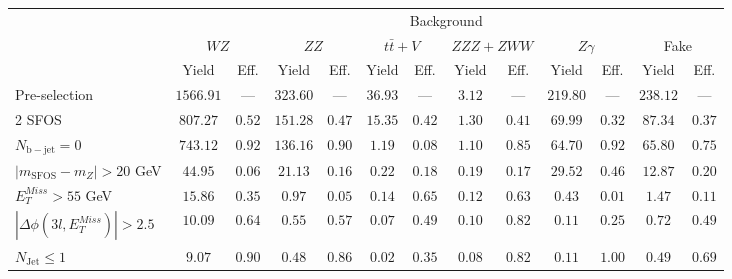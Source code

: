 \begin{tabular}{l||c|c||c|c||c|c||c|c||c|c||c|c}
\hline
 &       \multicolumn{12}{c||}{Background} \\
 & \multicolumn{2}{c||}{$WZ$} & \multicolumn{2}{c||}{$ZZ$} & \multicolumn{2}{c||}{$t\bar{t}+V$} & \multicolumn{2}{c||}{$ZZZ+ZWW$} & \multicolumn{2}{c||}{$Z\gamma$} & \multicolumn{2}{c}{Fake} \\ 
 & Yield & Eff. & Yield & Eff. & Yield & Eff. & Yield & Eff. & Yield & Eff. & Yield & Eff. \\
\hline\hline
Pre-selection &  $1566.91$ & --- &  $323.60$ & --- &  $36.93$ & --- &  $3.12$ & --- &  $219.80$ & --- &  $238.12$ & ---  \\ 
\hline
2 SFOS &  $807.27$ &  $0.52$ &  $151.28$ &  $0.47$ &  $15.35$ &  $0.42$ &  $1.30$ &  $0.41$ &  $69.99$ &  $0.32$ &  $87.34$ &  $0.37$ \\ 
\hline
$N_{\mathrm{b-jet}}=0$ &  $743.12$ &  $0.92$ &  $136.16$ &  $0.90$ &  $1.19$ &  $0.08$ &  $1.10$ &  $0.85$ &  $64.70$ &  $0.92$ &  $65.80$ &  $0.75$ \\ 
\hline
$| m_{\mathrm{SFOS}} - m_Z | >  20$ GeV &  $44.95$ &  $0.06$ &  $21.13$ &  $0.16$ &  $0.22$ &  $0.18$ &  $0.19$ &  $0.17$ &  $29.52$ &  $0.46$ &  $12.87$ &  $0.20$ \\ 
\hline
$E_{T}^{Miss} > 55$ GeV &  $15.86$ &  $0.35$ &  $0.97$ &  $0.05$ &  $0.14$ &  $0.65$ &  $0.12$ &  $0.63$ &  $0.43$ &  $0.01$ &  $1.47$ &  $0.11$ \\ 
\hline
$|\Delta\phi(3l,E_{T}^{Miss})| > 2.5$ &  $10.09$ &  $0.64$ &  $0.55$ &  $0.57$ &  $0.07$ &  $0.49$ &  $0.10$ &  $0.82$ &  $0.11$ &  $0.25$ &  $0.72$ &  $0.49$ \\ 
\hline
$N_{\mathrm{Jet}} \leq 1$ &  $9.07$ &  $0.90$ &  $0.48$ &  $0.86$ &  $0.02$ &  $0.35$ &  $0.08$ &  $0.82$ &  $0.11$ &  $1.00$ &  $0.49$ &  $0.69$ \\ 
\hline
\end{tabular}

